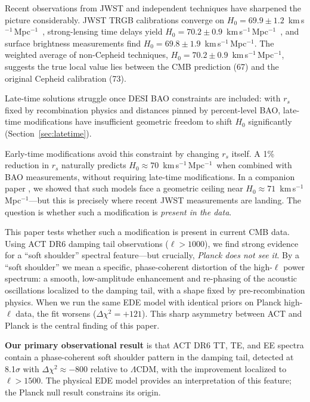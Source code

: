 \documentclass[twocolumn,showpacs,preprintnumbers,amsmath,amssymb,prd]{revtex4-2}
\newcommand{\lcdm}{$\Lambda$CDM}
\newcommand{\kms}{km\,s$^{-1}$\,Mpc$^{-1}$}
\begin{document}
Recent observations from JWST and independent techniques have sharpened the picture 
considerably. JWST TRGB calibrations converge on $H_0 = 69.9 \pm 1.2$~\kms\ 
\cite{Freedman2024}, strong-lensing time delays yield $H_0 = 70.2 \pm 0.9$~\kms\ 
\cite{H0LiCOW}, and surface brightness measurements find $H_0 = 69.8 \pm 1.9$~\kms. 
The weighted average of non-Cepheid techniques, $H_0 = 70.2 \pm 0.9$~\kms, suggests 
the true local value lies between the CMB prediction (67) and the original Cepheid 
calibration (73).

Late-time solutions struggle once DESI BAO constraints are included: with $r_s$ 
fixed by recombination physics and distances pinned by percent-level BAO, late-time 
modifications have insufficient geometric freedom to shift $H_0$ significantly 
(Section~\ref{sec:latetime}).

Early-time modifications avoid this constraint by changing $r_s$ itself. A 1\% reduction 
in $r_s$ naturally predicts $H_0 \approx 70$~\kms\ when combined with BAO measurements, 
without requiring late-time modifications. In a companion paper 
\citep[hereafter Paper~I]{Ridder2025a}, we showed that such models face 
a geometric ceiling near $H_0 \approx 71$~\kms---but this is precisely where recent 
JWST measurements are landing. The question is whether such a modification is 
\emph{present in the data}.

This paper tests whether such a modification is present in current CMB data. Using 
ACT DR6 damping tail observations ($\ell > 1000$), we find strong evidence for a 
``soft shoulder'' spectral feature---but crucially, \emph{Planck does not see it}. 
By a ``soft shoulder'' we mean a specific, phase-coherent distortion of the high-$\ell$ 
power spectrum: a smooth, low-amplitude enhancement and re-phasing of the acoustic 
oscillations localized to the damping tail, with a shape fixed by pre-recombination 
physics. When we run the same EDE model with identical priors on Planck high-$\ell$ 
data, the fit worsens ($\Delta\chi^2 = +121$). This sharp asymmetry between 
ACT and Planck is the central finding of this paper.

\textbf{Our primary observational result} is that ACT DR6 TT, TE, and EE spectra 
contain a phase-coherent soft shoulder pattern in the damping tail, detected at 
8.1$\sigma$ with $\Delta\chi^2 \approx -800$ relative to \lcdm, with the improvement 
localized to $\ell > 1500$. The physical EDE model provides an interpretation of 
this feature; the Planck null result constrains its origin.
\end{document}
